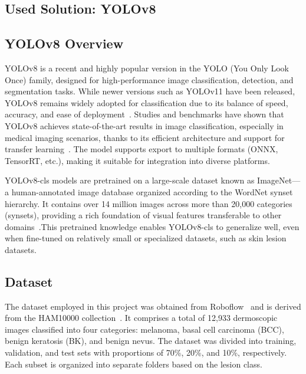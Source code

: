 \documentclass[a4paper,12pt]{report}
\begin{document}
\begin{spacing}{1.5}
\newpage

\chapter{Used Solution: YOLOv8}
    
    \section{YOLOv8 Overview}
    YOLOv8 is a recent and highly popular version in the YOLO (You Only Look Once) family, designed for high-performance image classification, detection, and segmentation tasks. While newer versions such as YOLOv11 have been released, YOLOv8 remains widely adopted for classification due to its balance of speed, accuracy, and ease of deployment~\cite{ultralytics23}. Studies and benchmarks have shown that YOLOv8 achieves state-of-the-art results in image classification, especially in medical imaging scenarios, thanks to its efficient architecture and support for transfer learning~\cite{ultralytics23,elgendi2023diagnostics}. The model supports export to multiple formats (ONNX, TensorRT, etc.), making it suitable for integration into diverse platforms.

    YOLOv8-cls models are pretrained on a large-scale dataset known as ImageNet—a human-annotated image database organized according to the WordNet synset hierarchy. It contains over 14 million images across more than 20,000 categories (synsets), providing a rich foundation of visual features transferable to other domains~\cite{ultralytics24}.This pretrained knowledge enables YOLOv8-cls to generalize well, even when fine-tuned on relatively small or specialized datasets, such as skin lesion datasets.
    
    \newpage
    \section{Dataset}

    The dataset employed in this project was obtained from Roboflow~\cite{roboflow24} and is derived from the HAM10000 collection~\cite{intro5}. It comprises a total of 12,933 dermoscopic images classified into four categories: melanoma, basal cell carcinoma (BCC), benign keratosis (BK), and benign nevus. The dataset was divided into training, validation, and test sets with proportions of 70\%, 20\%, and 10\%, respectively. Each subset is organized into separate folders based on the lesion class.
    

\end{spacing}
\end{document}
